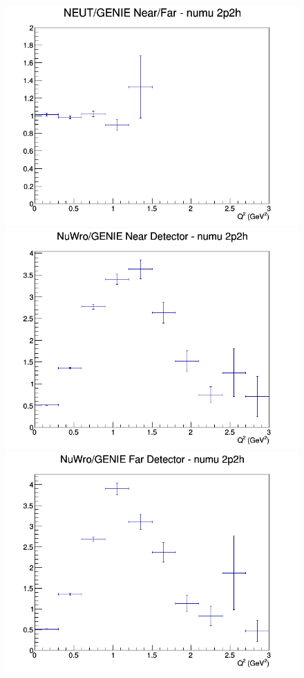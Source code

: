 \documentclass[12pt]{article}
\begin{document}
\begin{figure}[h]
\endminipage
{}
\includegraphics[width=\linewidth]{Q2/nominal/ratios/2p2h_NEUT_GENIE_numu_NF_Q2.png}
\endminipage
\newline
{}
\includegraphics[width=\linewidth]{Q2/nominal/ratios/2p2h_NuWro_GENIE_numu_near_Q2.png}
\endminipage
{}
\includegraphics[width=\linewidth]{Q2/nominal/ratios/2p2h_NuWro_GENIE_numu_far_Q2.png}

\end{figure}
\end{document}
